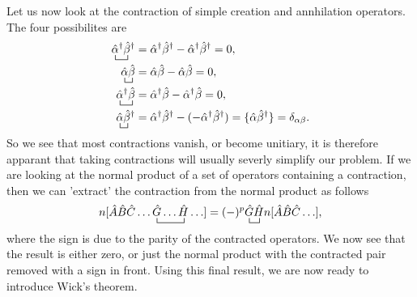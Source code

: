 \documentclass[a4paper, 11pt, notitlepage, english]{article}
\newcommand{\op}[1]{\hat{#1}}
\begin{document}
Let us now look at the contraction of simple creation and annhilation operators. The four possibilites are
\begin{align*}
\bcontraction[1ex]{}{\alpha}{^\dag}{\beta} \op{\alpha}^\dag \op{\beta}^\dag &= \op{\alpha}^\dag \op{\beta}^\dag - \op{\alpha}^\dag \op{\beta}^\dag = 0, \\
\bcontraction[1ex]{}{\alpha}{}{\beta} \op{\alpha} \op{\beta} &= \op{\alpha} \op{\beta} - \op{\alpha} \op{\beta} = 0, \\
\bcontraction[1ex]{}{\alpha}{^\dag}{\beta} \op{\alpha}^\dag \op{\beta} &= \op{\alpha}^\dag \op{\beta} - \op{\alpha}^\dag \op{\beta} = 0, \\
\bcontraction[1ex]{}{\alpha}{}{\beta} \op{\alpha} \op{\beta}^\dag &= \op{\alpha}^\dag \op{\beta}^\dag - (- \op{\alpha}^\dag \op{\beta}^\dag) = \{\op{\alpha}\op{\beta}^\dag\} = \delta_{\alpha\beta}.\\
\end{align*}
So we see that most contractions vanish, or become unitiary, it is therefore apparant that taking contractions will usually severly simplify our problem. If we are looking at the normal product of a set of operators containing a contraction, then we can 'extract' the contraction from the normal product as follows
$$n[\op{A}\op{B}\op{C}\ldots \bcontraction{}{G}{\ldots}{H}\op{G}\ldots \op{H}\ldots] = (-)^p \bcontraction{}{G}{}{H}\op{G}\op{H} n[\op{A}\op{B}\op{C}\ldots],$$
where the sign is due to the parity of the contracted operators. We now see that the result is either zero, or just the normal product with the contracted pair removed with a sign in front. Using this final result, we are now ready to introduce Wick's theorem.

\vspace{0.2cm}
\end{document}
